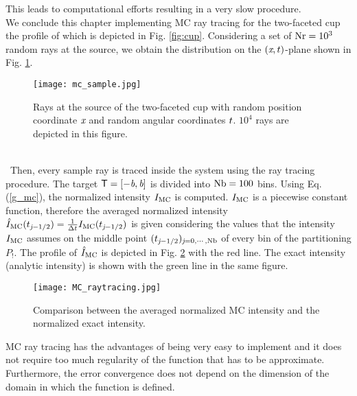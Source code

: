 This leads to computational efforts resulting in a very slow procedure.\\ \indent
We conclude this chapter implementing MC ray tracing for the two-faceted cup the profile of which is depicted in Fig. \ref{fig:cup}. 
Considering a set of $\textrm{Nr} = 10^3$ random rays 
at the source, we obtain the distribution on the $(\textit{x}, t)$-plane shown in Fig. \ref{fig:mc_sample}.
\begin{figure}[h]
\begin{center}
    \texttt{[image: mc\_sample.jpg]}
    \caption{Rays at the source of the two-faceted cup with random position coordinate $\textit{x}$ and random angular coordinates $t$. $10^4$ rays are depicted in this figure.}
    \label{fig:mc_sample}
\end{center}
  \end{figure}
\\\ Then, every sample ray is traced inside the system using the ray tracing procedure. 
The target $\textsf{T} = [-\textit{b}, \textit{b}]$ is divided into $\textrm{Nb}= 100$ bins.
Using Eq. (\ref{g_mc}), the normalized intensity $I_{\textrm{MC}}$ is computed. $I_{\textrm{MC}}$  is a piecewise constant function, therefore the averaged normalized intensity  $\hat{I}_{\textrm{MC}}(t_{\textit{j}-1/2})= \frac{1}{\Delta t}I_{\textrm{MC}}(t_{\textit{j}-1/2})$ is given considering the values that the intensity $I_{\textrm{MC}}$ assumes on the middle point $(t_{\textit{j}-1/2})_{\textit{j} = 0, \cdots, \textrm{Nb}}$ of every bin of the partitioning $P_!$. The profile of $\hat{I}_{\textrm{MC}}$ is depicted in Fig. \ref{fig:mc_intensity} with the red line. The exact intensity (analytic intensity) is shown with the green line in the same figure.
\begin{figure}[t]
\begin{center}
    \texttt{[image: MC\_raytracing.jpg]}
    \caption{Comparison between the averaged normalized MC intensity and the normalized exact intensity.}
   \label{fig:mc_intensity}
\end{center}
\end{figure}
MC ray tracing has the advantages of being very easy to implement and it does not require too much regularity of the function that has to be approximate. Furthermore, the error convergence does not depend on the dimension of the domain in which the function is defined.
